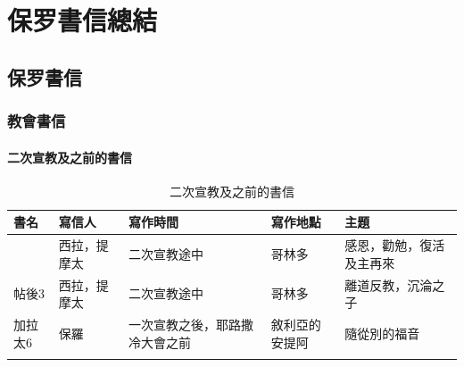 

\chapter{保罗書信總結}
\section{保罗書信}


\subsection{教會書信}

\subsubsection{二次宣教及之前的書信}
\vspace*{-\baselineskip}
\def\rowi  {帖前5 & 西拉，提摩太&二次宣教途中&哥林多&感恩，勸勉，復活及主再來  \\}
\def\rowii {帖後3 & 西拉，提摩太 &二次宣教途中&哥林多&離道反教，沉淪之子\\}
\def\rowiii{加拉太6 & 保羅 &一次宣教之後，耶路撒冷大會之前&敘利亞的安提阿&隨從別的福音\\}
\begin{table}[!hbp]
\begin{tabular}{lllll}
\toprule
書名 & 寫信人 & 寫作時間&寫作地點&主題\\
\midrule
\sortfirstcol{\rowi\rowii\rowiii}
\bottomrule
\end{tabular}
\caption{二次宣教及之前的書信}
\end{table}

